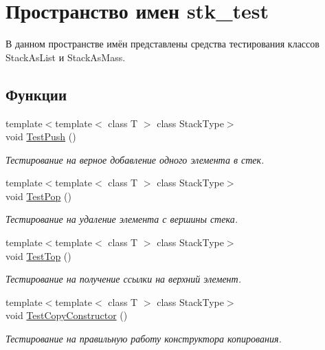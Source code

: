 \hypertarget{namespacestk__test}{}\section{Пространство имен stk\+\_\+test}
\label{namespacestk__test}


В данном пространстве имён представлены средства тестирования классов Stack\+As\+List и Stack\+As\+Mass.  


\subsection*{Функции}
\begin{DoxyCompactItemize}
\item 
{\footnotesize template$<$template$<$ class T $>$ class Stack\+Type$>$ }\\void \hyperlink{namespacestk__test_a2d62ae6019345309a38d3a15ff28cc5d}{Test\+Push} ()
\begin{DoxyCompactList}\small\item\em Тестирование на верное добавление одного элемента в стек. \end{DoxyCompactList}\item 
{\footnotesize template$<$template$<$ class T $>$ class Stack\+Type$>$ }\\void \hyperlink{namespacestk__test_a359fc261443d7bdcd4d9bfa43ce9dc7d}{Test\+Pop} ()
\begin{DoxyCompactList}\small\item\em Тестирование на удаление элемента с вершины стека. \end{DoxyCompactList}\item 
{\footnotesize template$<$template$<$ class T $>$ class Stack\+Type$>$ }\\void \hyperlink{namespacestk__test_aadcc1a403c31c6f26df731492b32bb5e}{Test\+Top} ()
\begin{DoxyCompactList}\small\item\em Тестирование на получение ссылки на верхний элемент. \end{DoxyCompactList}\item 
{\footnotesize template$<$template$<$ class T $>$ class Stack\+Type$>$ }\\void \hyperlink{namespacestk__test_aa0039c601a4cf946ebfaad9ef3af4e7f}{Test\+Copy\+Constructor} ()
\begin{DoxyCompactList}\small\item\em Тестирование на правильную работу конструктора копирования. \end{DoxyCompactList}\item 

\end{DoxyCompactItemize}
